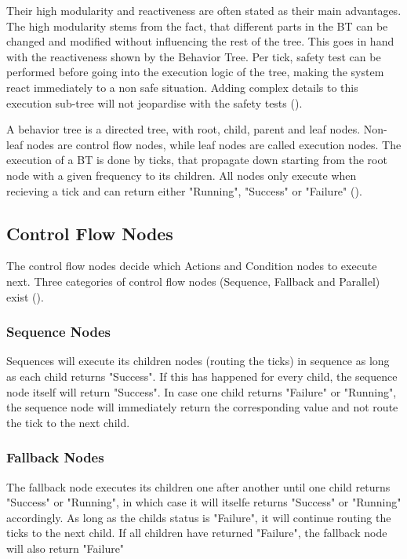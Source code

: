 Their high modularity and reactiveness are often stated as their main advantages. The high modularity stems from the fact, that different parts in the BT can be changed and modified without influencing the rest of the tree. This goes in hand with the reactiveness shown by the Behavior Tree. Per tick, safety test can be performed before going into the execution logic of the tree, making the system react immediately to a non safe situation. Adding complex details to this execution sub-tree will not jeopardise with the safety tests (\cite{sprague_improving_2018}).

A behavior tree is a directed tree, with root, child, parent and leaf nodes. Non-leaf nodes are control flow nodes, while leaf nodes are called execution nodes. The execution of a BT is done by ticks, that propagate down starting from the root node with a given frequency to its children. All nodes only execute when recieving a tick and can return either "Running", "Success" or "Failure" (\cite{collendanchise_behavior_2019}).

\subsection{Control Flow Nodes}
The control flow nodes decide which Actions and Condition nodes to execute next. Three categories of control flow nodes (Sequence, Fallback and Parallel) exist (\cite{collendanchise_behavior_2019}).

\subsubsection{Sequence Nodes}
Sequences will execute its children nodes (routing the ticks) in sequence as long as each child returns "Success". If this has happened for every child, the sequence node itself will return "Success". In case one child returns "Failure" or "Running", the sequence node will immediately return the corresponding value and not route the tick to the next child.

\subsubsection{Fallback Nodes}
The fallback node executes its children one after another until one child returns "Success" or "Running", in which case it will itselfe returns "Success" or "Running" accordingly. As long as the childs status is "Failure", it will continue routing the ticks to the next child. If all children have returned "Failure", the fallback node will also return "Failure"

